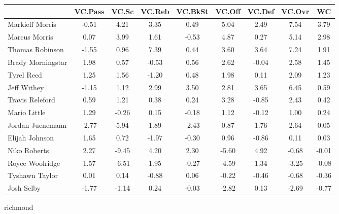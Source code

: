 \documentclass[10pt,letterpaper]{article}
\begin{document}
\begin{table}[ht]
\begin{center}
\begin{tabular}{lcccccccc}
  \hline
 & VC.Pass & VC.Sc & VC.Reb & VC.BkSt & VC.Off & VC.Def & VC.Ovr & WC \\ 
  \hline
Markieff Morris & -0.51 & 4.21 & 3.35 & 0.49 & 5.04 & 2.49 & 7.54 & 3.79 \\ 
  Marcus Morris & 0.07 & 3.99 & 1.61 & -0.53 & 4.87 & 0.27 & 5.14 & 2.98 \\ 
  Thomas Robinson & -1.55 & 0.96 & 7.39 & 0.44 & 3.60 & 3.64 & 7.24 & 1.91 \\ 
  Brady Morningstar & 1.98 & 0.57 & -0.53 & 0.56 & 2.62 & -0.04 & 2.58 & 1.45 \\ 
  Tyrel Reed & 1.25 & 1.56 & -1.20 & 0.48 & 1.98 & 0.11 & 2.09 & 1.23 \\ 
  Jeff Withey & -1.15 & 1.12 & 2.99 & 3.50 & 2.81 & 3.65 & 6.45 & 0.59 \\ 
  Travis Releford & 0.59 & 1.21 & 0.38 & 0.24 & 3.28 & -0.85 & 2.43 & 0.42 \\ 
  Mario Little & 1.29 & -0.26 & 0.15 & -0.18 & 1.12 & -0.12 & 1.00 & 0.24 \\ 
  Jordan Juenemann & -2.77 & 5.94 & 1.89 & -2.43 & 0.87 & 1.76 & 2.64 & 0.05 \\ 
  Elijah Johnson & 1.65 & 0.72 & -1.97 & -0.30 & 0.96 & -0.86 & 0.11 & 0.03 \\ 
  Niko Roberts & 2.27 & -9.45 & 4.20 & 2.30 & -5.60 & 4.92 & -0.68 & -0.01 \\ 
  Royce Woolridge & 1.57 & -6.51 & 1.95 & -0.27 & -4.59 & 1.34 & -3.25 & -0.08 \\ 
  Tyshawn Taylor & 0.01 & 0.14 & -0.88 & 0.06 & -0.22 & -0.46 & -0.68 & -0.36 \\ 
  Josh Selby & -1.77 & -1.14 & 0.24 & -0.03 & -2.82 & 0.13 & -2.69 & -0.77 \\ 
   \hline
\end{tabular}
\end{center}
\end{table}
\newpage
\begin{center}
richmond 
\end{center}
\end{document}
